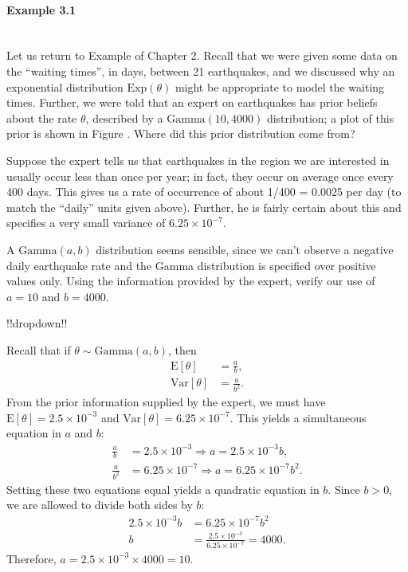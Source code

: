 \paragraph{Example 3.1}{~\\

\noindent Let us return to Example  of Chapter 2.  Recall that we were given some data on the ``waiting times'', in days, between 21 earthquakes, and we discussed why an exponential distribution $\mathrm{Exp}(\theta)$ might be appropriate to model the waiting times.  Further, we were told that an expert on earthquakes has prior beliefs about the rate $\theta$, described by a $\mathrm{Gamma}(10,4000)$ distribution; a plot of this prior is shown in Figure .  Where did this prior distribution come from?

Suppose the expert tells us that earthquakes in the region we are interested in usually occur less than once per year; in fact, they occur on average once every 400 days.  This gives us a rate of occurrence of about 1/400 = 0.0025 per day (to match the ``daily'' units given above).  Further, he is fairly certain about this and specifies a very small variance of $6.25 \times 10^{-7}$.  

A $\mathrm{Gamma}(a,b)$ distribution seems sensible, since we can't observe a negative daily earthquake rate and the Gamma distribution is specified over positive values only.  Using the information provided by the expert, verify our use of $a=10$ and $b=4000$.}

!!dropdown!!

Recall that if $\theta \sim \mathrm{Gamma}(a,b)$, then
    \begin{align*}
        \text{E}[\theta] &= \frac{a}{b}, \\
        \text{Var}[\theta] &= \frac{a}{b^2}.
    \end{align*}
    From the prior information supplied by the expert, we must have $\text{E}[\theta] = 2.5\times 10^{-3}$ and $\text{Var}[\theta] = 6.25\times 10^{-7}$. This yields a simultaneous equation in $a$ and $b$:
    \begin{align*}
        \frac{a}{b} &= 2.5\times 10^{-3} \Rightarrow a = 2.5\times 10^{-3} b, \\
        \frac{a}{b^2} &= 6.25\times 10^{-7} \Rightarrow a = 6.25\times 10^{-7}b^2.
    \end{align*}
    Setting these two equations equal yields a quadratic equation in $b$. Since $b > 0$, we are allowed to divide both sides by $b$:
    \begin{align*}
        2.5\times 10^{-3} b &= 6.25\times 10^{-7}b^2 \\
        b &= \frac{2.5\times 10^{-3}}{ 6.25\times 10^{-7}} = 4000.
    \end{align*}
    Therefore, $a = 2.5\times 10^{-3} \times 4000 = 10$.

